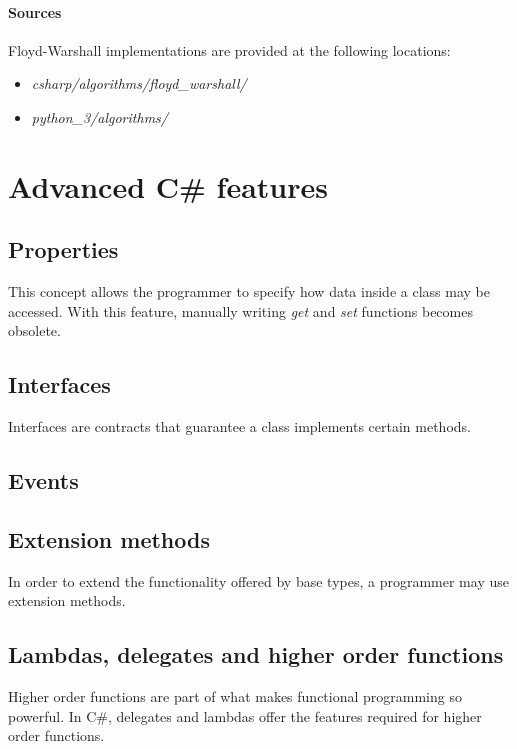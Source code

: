 \documentclass{article}
\begin{document}
\paragraph{Sources}
Floyd-Warshall implementations are provided at the following locations:
\begin{itemize}
\item{{\em csharp/algorithms/floyd\_warshall/}}
\item{{\em python\_3/algorithms/}}
\end{itemize}


\newpage



\iffalse



\section{Advanced C\# features}
\subsection{Properties}
This concept allows the programmer to specify how data inside a class may be accessed.
With this feature, manually writing {\em get} and {\em set} functions becomes obsolete.

\subsection{Interfaces}
Interfaces are contracts that guarantee a class implements certain methods.

\subsection{Events}


\subsection{Extension methods}
In order to extend the functionality offered by base types, a programmer may use extension methods.

\subsection{Lambdas, delegates and higher order functions}
Higher order functions are part of what makes functional programming so powerful.
In C\#, delegates and lambdas offer the features required for higher order functions.
\end{document}
